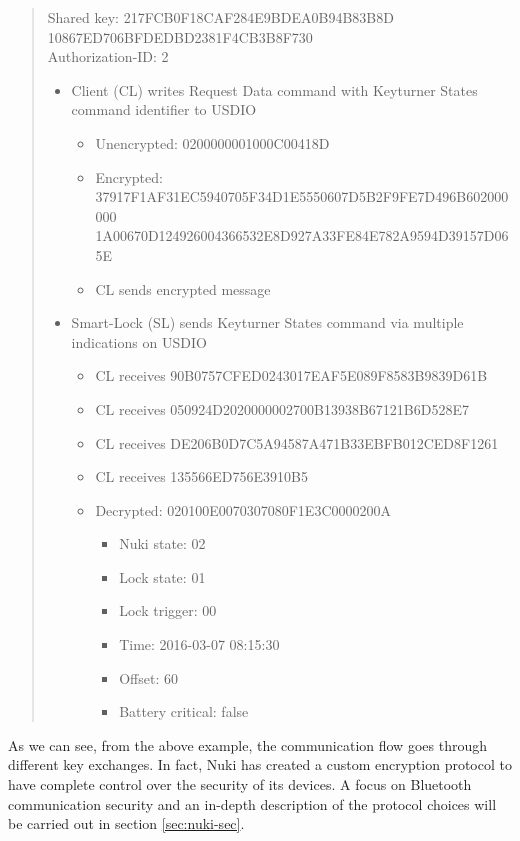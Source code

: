 \begin{quotation}
\footnotesize
Shared key: 217FCB0F18CAF284E9BDEA0B94B83B8D \\ 
            10867ED706BFDEDBD2381F4CB3B8F730 \\

Authorization-ID: 2 \\

\begin{itemize}
    \item Client (CL) writes Request Data command with Keyturner States command identifier to USDIO
    \begin{itemize}
        \item Unencrypted: 0200000001000C00418D 
        \item Encrypted: \\ 37917F1AF31EC5940705F34D1E5550607D5B2F9FE7D496B602000000 \\
        1A00670D124926004366532E8D927A33FE84E782A9594D39157D065E
        \item CL sends encrypted message
    \end{itemize}
    \item Smart-Lock (SL) sends Keyturner States command via multiple indications on USDIO
    \begin{itemize}
        \item CL receives 90B0757CFED0243017EAF5E089F8583B9839D61B
        \item CL receives 050924D2020000002700B13938B67121B6D528E7
        \item CL receives DE206B0D7C5A94587A471B33EBFB012CED8F1261
        \item CL receives 135566ED756E3910B5
        \item Decrypted: 020100E0070307080F1E3C0000200A
        \begin{itemize}
            \item Nuki state: 02
            \item Lock state: 01
            \item Lock trigger: 00
            \item Time: 2016-03-07 08:15:30
            \item Offset: 60
            \item Battery critical: false \vspace*{-\baselineskip}
        \end{itemize}
    \end{itemize}
\end{itemize}\vspace*{-\baselineskip}
\end{quotation}\vspace*{-\baselineskip}
As we can see, from the above example, the communication flow goes through different key exchanges. In fact, Nuki has created a custom encryption protocol to have complete control over the security of its devices. A focus on Bluetooth communication security and an in-depth description of the protocol choices will be carried out in section \ref{sec:nuki-sec}.

